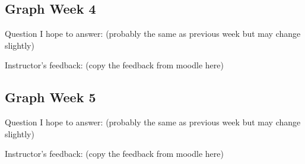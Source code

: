 \documentclass[
]{article}
\begin{document}
\hypertarget{graph-week-4}{%
\subsection{Graph Week 4}\label{graph-week-4}}

Question I hope to answer: (probably the same as previous week but may
change slightly)

Instructor's feedback: (copy the feedback from moodle here)

\hypertarget{graph-week-5}{%
\subsection{Graph Week 5}\label{graph-week-5}}

Question I hope to answer: (probably the same as previous week but may
change slightly)

Instructor's feedback: (copy the feedback from moodle here)
\end{document}

